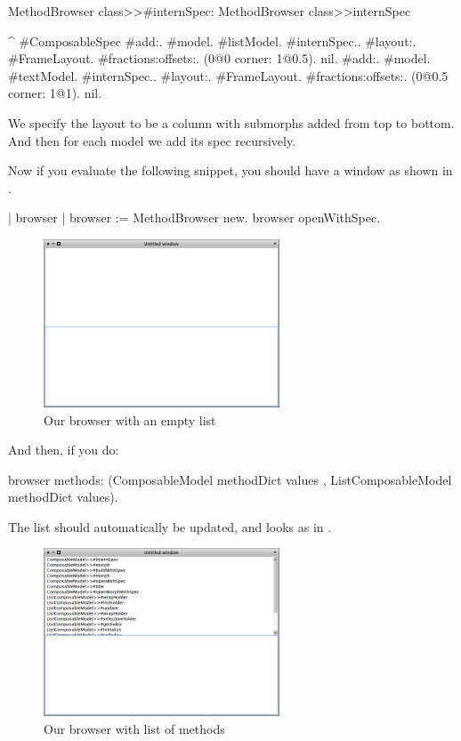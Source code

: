 \documentclass[a4paper,10pt,twoside]{book}
\begin{document}
\begin{method}{MethodBrowser class>>\#internSpec:}
MethodBrowser class>>internSpec

	^{ #ComposableSpec
			#add:. {{#model. #listModel. #internSpec.}.
						#layout:. {#FrameLayout.
									#fractions:offsets:. (0@0 corner: 1@0.5). nil}}.
			#add:. {{#model. #textModel. #internSpec.}.
						#layout:. {#FrameLayout.
									#fractions:offsets:. (0@0.5 corner: 1@1). nil}}}.
\end{method}
%
We specify the layout to be a column with submorphs added from top to bottom. And then for each model we add its spec recursively.

Now if you evaluate the following snippet, you should have a window as shown in .

\begin{code}{}
| browser |
browser := MethodBrowser new.
browser openWithSpec.
\end{code}



\begin{figure}[ht]
\begin{center}
	\includegraphics[width=7cm]{MethodBrowser1}
	\caption{Our browser with an empty list}
\end{center}
\end{figure}

And then, if you do:
%
\begin{code}{}
browser  methods: (ComposableModel methodDict values , ListComposableModel methodDict values).
\end{code}
The list should automatically be updated, and looks as in .
\begin{figure}[ht]
\begin{center}
	\includegraphics[width=7cm]{MethodBrowser2}
	\caption{Our browser with list of methods}
\end{center}
\end{figure}
\end{document}
